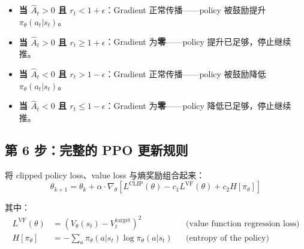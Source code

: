 \begin{itemize}
  \item \textbf{当 $\hat{A}_t > 0$ 且 $r_t < 1+\epsilon$}：Gradient 正常传播——policy 被鼓励提升 $\pi_\theta(a_t|s_t)$。
  \item \textbf{当 $\hat{A}_t > 0$ 且 $r_t \geq 1+\epsilon$}：Gradient 为\textbf{零}——policy 提升已足够，停止继续推。
  \item \textbf{当 $\hat{A}_t < 0$ 且 $r_t > 1-\epsilon$}：Gradient 正常传播——policy 被鼓励降低 $\pi_\theta(a_t|s_t)$。
  \item \textbf{当 $\hat{A}_t < 0$ 且 $r_t \leq 1-\epsilon$}：Gradient 为\textbf{零}——policy 降低已足够，停止继续推。
\end{itemize}

\subsection{第 6 步：完整的 PPO 更新规则}
\label{step-6-the-complete-ppo-update-rule}

将 clipped policy loss、value loss 与熵奖励组合起来：
\begin{equation}
\boxed{\theta_{k+1} = \theta_k + \alpha \cdot \nabla_\theta \left[L^{\text{CLIP}}(\theta) - c_1 L^{\text{VF}}(\theta) + c_2 H[\pi_\theta]\right]}
\end{equation}

其中：
\begin{align}
L^{\text{VF}}(\theta) &= \left(V_\theta(s_t) - V_t^{\text{target}}\right)^2 & &\text{(value function regression loss)} \\
H[\pi_\theta] &= -\sum_a \pi_\theta(a|s_t)\log\pi_\theta(a|s_t) & &\text{(entropy of the policy)}
\end{align}

